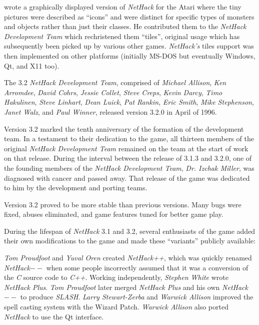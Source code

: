 \medskip
{} wrote a graphically displayed version
of {\it NetHack\/}
for the Atari where the tiny pictures were described as ``icons'' and
were distinct for specific types of monsters and objects rather than just
their classes.
He contributed them to the {\it NetHack Development Team\/} which
rechristened them ``tiles'', original usage which has subsequently been
picked up by various other games.
{\it NetHack's\/} tiles support was then implemented on other platforms
(initially MS-DOS but eventually Windows, Qt, and X11 too).

\medskip
\nd The 3.2 {\it NetHack Development Team}, comprised of {\it Michael Allison}, {\it Ken
Arromdee}, {\it David Cohrs}, {\it Jessie Collet}, {\it Steve Creps}, {\it
Kevin Darcy}, {\it Timo Hakulinen}, {\it Steve Linhart}, {\it Dean Luick},
{\it Pat Rankin}, {\it Eric Smith}, {\it Mike Stephenson}, {\it Janet Walz},
and {\it Paul Winner}, released version 3.2.0 in April of 1996.

\medskip
\nd Version 3.2 marked the tenth anniversary of the formation of the
development team.
In a testament to their dedication to the game, all thirteen members
of the original {\it NetHack Development Team} remained on the team at the
start of work on that release.
During the interval between the release of 3.1.3 and 3.2.0,
one of the founding members of the {\it NetHack Development Team},
{\it Dr. Izchak Miller}, was diagnosed with cancer and passed away.
That release of the game was
dedicated to him by the development and porting teams.

Version 3.2 proved to be more stable than previous versions.
Many bugs were fixed, abuses eliminated, and game features tuned for
better game play.

\medskip
During the lifespan of {\it NetHack\/} 3.1 and 3.2, several enthusiasts
of the game added
their own modifications to the game and made these ``variants'' publicly
available:

\medskip
{\it Tom Proudfoot} and {\it Yuval Oren} created {\it NetHack++},
which was quickly renamed {\it NetHack$--$\/}
when some people incorrectly assumed that it was a conversion of the
{\it C\/} source code to {\it C++}.
Working independently, {\it Stephen White} wrote {\it NetHack Plus}.
{\it Tom Proudfoot} later merged {\it NetHack Plus}
and his own {\it NetHack$--$} to produce {\it SLASH}.
{\it Larry Stewart-Zerba} and {\it Warwick Allison} improved the spell
casting system with the Wizard Patch.
{\it Warwick Allison} also ported {\it NetHack\/} to use the Qt interface.

